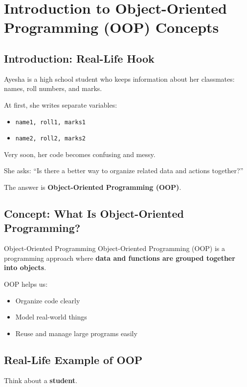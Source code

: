 \chapter{Introduction to Object-Oriented Programming (OOP) Concepts}

\section{Introduction: Real-Life Hook}

Ayesha is a high school student who keeps information about her classmates:
names, roll numbers, and marks.

At first, she writes separate variables:
\begin{itemize}
    \item \texttt{name1, roll1, marks1}
    \item \texttt{name2, roll2, marks2}
\end{itemize}

Very soon, her code becomes confusing and messy.

She asks:
``Is there a better way to organize related data and actions together?''

The answer is \textbf{Object-Oriented Programming (OOP)}.

\section{Concept: What Is Object-Oriented Programming?}

\begin{definition}{Object-Oriented Programming}
Object-Oriented Programming (OOP) is a programming approach where \textbf{data and functions are grouped together into objects}.
\end{definition}

OOP helps us:
\begin{itemize}
    \item Organize code clearly
    \item Model real-world things
    \item Reuse and manage large programs easily
\end{itemize}

\section{Real-Life Example of OOP}

Think about a \textbf{student}.

